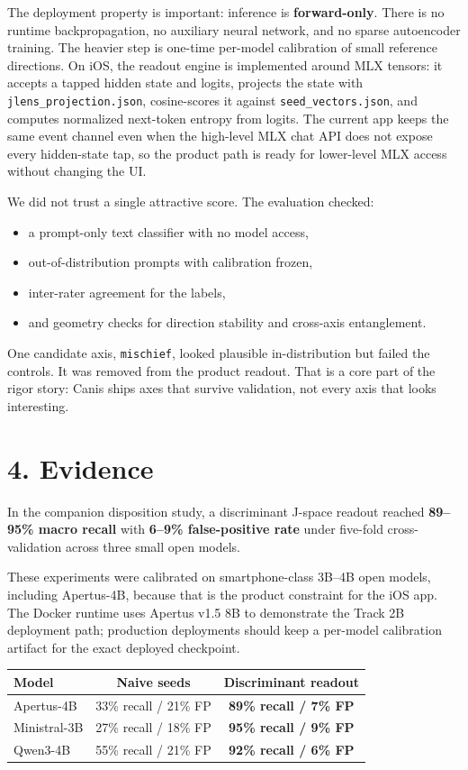 \documentclass[10pt,a4paper]{article}
\newcommand{\sectionrule}{\vspace{-2pt}{\color{canisLine}\hrule}\vspace{4pt}}
\begin{document}
The deployment property is important: inference is \textbf{forward-only}. There is no runtime backpropagation, no auxiliary neural network, and no sparse autoencoder training. The heavier step is one-time per-model calibration of small reference directions. On iOS, the readout engine is implemented around MLX tensors: it accepts a tapped hidden state and logits, projects the state with \texttt{jlens\_projection.json}, cosine-scores it against \texttt{seed\_vectors.json}, and computes normalized next-token entropy from logits. The current app keeps the same event channel even when the high-level MLX chat API does not expose every hidden-state tap, so the product path is ready for lower-level MLX access without changing the UI.

We did not trust a single attractive score. The evaluation checked:
\begin{itemize}
\item a prompt-only text classifier with no model access,
\item out-of-distribution prompts with calibration frozen,
\item inter-rater agreement for the labels,
\item and geometry checks for direction stability and cross-axis entanglement.
\end{itemize}

One candidate axis, \texttt{mischief}, looked plausible in-distribution but failed the controls. It was removed from the product readout. That is a core part of the rigor story: Canis ships axes that survive validation, not every axis that looks interesting.

\section*{4. Evidence}
\sectionrule
In the companion disposition study, a discriminant J-space readout reached \textbf{89--95\% macro recall} with \textbf{6--9\% false-positive rate} under five-fold cross-validation across three small open models.

These experiments were calibrated on smartphone-class 3B--4B open models, including Apertus-4B, because that is the product constraint for the iOS app. The Docker runtime uses Apertus v1.5 8B to demonstrate the Track 2B deployment path; production deployments should keep a per-model calibration artifact for the exact deployed checkpoint.

\begin{center}
\begin{tabular}{lcc}
\toprule
\textbf{Model} & \textbf{Naive seeds} & \textbf{Discriminant readout} \\
\midrule
Apertus-4B & 33\% recall / 21\% FP & \textbf{89\% recall / 7\% FP} \\
Ministral-3B & 27\% recall / 18\% FP & \textbf{95\% recall / 9\% FP} \\
Qwen3-4B & 55\% recall / 21\% FP & \textbf{92\% recall / 6\% FP} \\
\bottomrule
\end{tabular}
\end{center}
\end{document}
